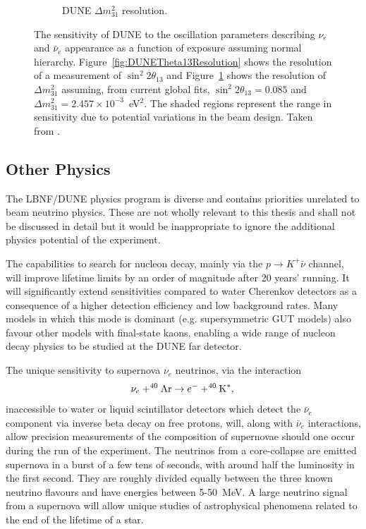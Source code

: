 \begin{figure}
\begin{subfigure}[t]{0.48\linewidth}
    \caption{DUNE $\Delta m_{31}^2$ resolution.}
    \label{fig:DUNEDeltaM31Resolution}
  \end{subfigure}
  \caption[The sensitivity of DUNE to the oscillation parameters describing $\nu_e$ and $\bar{\nu}_e$ appearance.]{The sensitivity of DUNE to the oscillation parameters describing $\nu_e$ and $\bar{\nu}_e$ appearance as a function of exposure assuming normal hierarchy.  Figure~\ref{fig:DUNETheta13Resolution} shows the resolution of a measurement of $\sin^2{2\theta_{13}}$ and Figure~\ref{fig:DUNEDeltaM31Resolution} shows the resolution of $\Delta m_{31}^2$ assuming, from current global fits, $\sin^2{2\theta_{13}}=0.085$ and $\Delta m_{31}^2=2.457\times10^{-3}$~eV$^2$.  The shaded regions represent the range in sensitivity due to potential variations in the beam design.  Taken from \cite{DUNECDR2}.}
  \label{fig:DUNETheta13}
\end{figure}

\subsection{Other Physics}\label{sec:DUNEOtherPhysics}

The LBNF/DUNE physics program is diverse and contains priorities unrelated to beam neutrino physics.  These are not wholly relevant to this thesis and shall not be discussed in detail but it would be inappropriate to ignore the additional physics potential of the experiment.

The capabilities to search for nucleon decay, mainly via the $p\rightarrow K^+\bar{\nu}$ channel, will improve lifetime limits by an order of magnitude after 20 years' running.  It will significantly extend sensitivities compared to water Cherenkov detectors as a consequence of a higher detection efficiency and low background rates.  Many models in which this mode is dominant (e.g. supersymmetric GUT models) also favour other models with final-state kaons, enabling a wide range of nucleon decay physics to be studied at the DUNE far detector.

The unique sensitivity to supernova $\nu_e$ neutrinos, via the interaction
\begin{equation}
  \nu_e + ^{40}\textnormal{Ar} \rightarrow e^- + ^{40}\textnormal{K}^*, \\
\end{equation}
inaccessible to water or liquid scintillator detectors which detect the $\bar{\nu}_e$ component via inverse beta decay on free protons, will, along with $\bar{\nu}_e$ interactions, allow precision measurements of the composition of supernovae should one occur during the run of the experiment.  The neutrinos from a core-collapse are emitted supernova in a burst of a few tens of seconds, with around half the luminosity in the first second.  They are roughly divided equally between the three known neutrino flavours and have energies between 5-50~MeV.  A large neutrino signal from a supernova will allow unique studies of astrophysical phenomena related to the end of the lifetime of a star.

